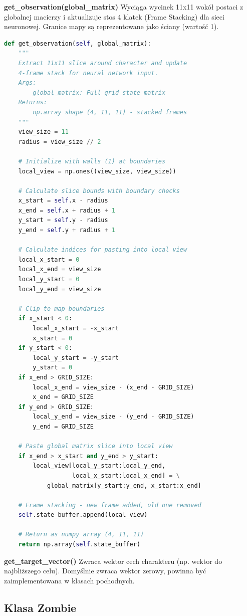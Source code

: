 \documentclass[12pt,a4paper]{article}
\begin{document}
\textbf{get\_observation(global\_matrix)}
Wyciąga wycinek 11x11 wokół postaci z globalnej macierzy i aktualizuje stos 4 klatek (Frame Stacking) dla sieci neuronowej. Granice mapy są reprezentowane jako ściany (wartość 1).

\begin{lstlisting}[language=Python]
def get_observation(self, global_matrix):
    """
    Extract 11x11 slice around character and update
    4-frame stack for neural network input.
    Args:
        global_matrix: Full grid state matrix
    Returns:
        np.array shape (4, 11, 11) - stacked frames
    """
    view_size = 11
    radius = view_size // 2
    
    # Initialize with walls (1) at boundaries
    local_view = np.ones((view_size, view_size))
    
    # Calculate slice bounds with boundary checks
    x_start = self.x - radius
    x_end = self.x + radius + 1
    y_start = self.y - radius
    y_end = self.y + radius + 1
    
    # Calculate indices for pasting into local view
    local_x_start = 0
    local_x_end = view_size
    local_y_start = 0
    local_y_end = view_size
    
    # Clip to map boundaries
    if x_start < 0:
        local_x_start = -x_start
        x_start = 0
    if y_start < 0:
        local_y_start = -y_start
        y_start = 0
    if x_end > GRID_SIZE:
        local_x_end = view_size - (x_end - GRID_SIZE)
        x_end = GRID_SIZE
    if y_end > GRID_SIZE:
        local_y_end = view_size - (y_end - GRID_SIZE)
        y_end = GRID_SIZE
    
    # Paste global matrix slice into local view
    if x_end > x_start and y_end > y_start:
        local_view[local_y_start:local_y_end,
                   local_x_start:local_x_end] = \
            global_matrix[y_start:y_end, x_start:x_end]
    
    # Frame stacking - new frame added, old one removed
    self.state_buffer.append(local_view)
    
    # Return as numpy array (4, 11, 11)
    return np.array(self.state_buffer)
	\end{lstlisting}

\textbf{get\_target\_vector()}
Zwraca wektor cech charakteru (np. wektor do najbliższego celu). Domyślnie zwraca wektor zerowy, powinna być zaimplementowana w klasach pochodnych.

\subsection{Klasa Zombie}
\end{document}
